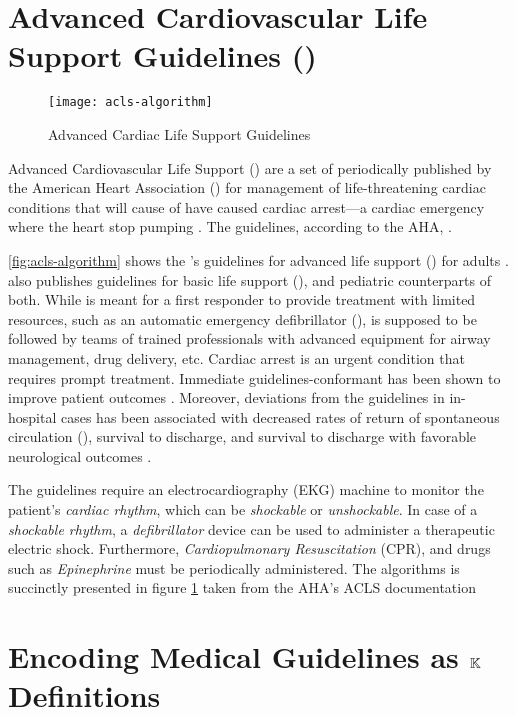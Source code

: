 \section{Advanced Cardiovascular Life Support Guidelines (\ACLS{})}\label{sec:acls}

\begin{figure}[t!]
  \centering
  \texttt{[image: acls-algorithm]}
  \caption{Advanced Cardiac Life Support Guidelines}\label{fig:acls-algorithm}
\end{figure}

Advanced Cardiovascular Life Support (\ACLS{}) are a set of \BPGs{} periodically
published by the American Heart Association (\AHA{}) for management of
life-threatening cardiac conditions that will cause of have caused cardiac
arrest---a cardiac emergency where the heart stop pumping \cite{ACLSWikiEntry}.
The guidelines, according to the AHA{},  \cite{ACLSUrl}.

\autoref{fig:acls-algorithm} shows the \AHA{}'s guidelines for advanced
life support (\ALS{}) for adults \cite{ACLSGuidelineUrl}.
\AHA{} also publishes guidelines
for basic life support (\BLS{}), and pediatric counterparts of both. While
\BLS{} is meant for a first responder to provide treatment with
limited resources, such as an automatic emergency defibrillator (\AED{}),
\ACLS{} is supposed to be followed by teams of
trained professionals with advanced equipment for airway management,
drug delivery, etc. Cardiac arrest is an urgent condition that requires
prompt treatment. Immediate \ACLS{} guidelines-conformant has been
shown to improve patient outcomes \cite{HonarmandResuscitation18}.
Moreover, deviations from the guidelines in in-hospital cases has been
associated with decreased rates of return of spontaneous circulation (\ROSC{}),
 survival to discharge, and survival to discharge with favorable neurological
 outcomes \cite{CrawleyResuscitation20}.




The guidelines require an electrocardiography (EKG) machine
to monitor the patient's \textit{cardiac rhythm}, which can be
\textit{shockable} or \textit{unshockable}.
In case of a \textit{shockable
rhythm}, a \textit{defibrillator} device can be used to administer
a therapeutic electric shock. Furthermore, \textit{Cardiopulmonary Resuscitation} (CPR),
and drugs such as \textit{Epinephrine} must be periodically administered.
The algorithms is succinctly presented in figure \ref{fig:acls-algorithm} taken
from the AHA's ACLS documentation \cite{AHAUrl}


\section{Encoding Medical Guidelines as $\mathbb{K}$ Definitions}\label{sec:bpg-in-k}



